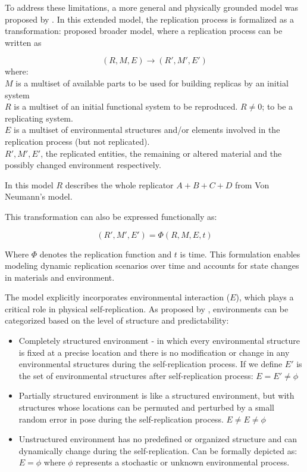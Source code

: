 To address these limitations, a more general and physically grounded model was proposed by \citeauthor{Lee2007Robotic} \cite{Lee2007Robotic}. In this extended model, the replication process is formalized as a transformation:
\citeauthor{Lee2007Robotic} proposed broader model, where a replication process can
be written as

\begin{equation}
    \label{eq:formalModel2arrow}
    (R, M, E) \rightarrow (R' , M' , E' ) 
\end{equation}
where: \\
$M$ is a multiset of available parts to be used for building replicas by an initial system \\
$R$ is a multiset of an initial functional system to be reproduced. 
$R \neq 0$; to be a replicating system. \\ 
$E$ is a multiset of environmental structures and/or elements involved in 
the replication process (but not replicated). \\
$R', M', E'$, the replicated entities, the remaining or altered material 
and the possibly changed environment respectively.

In this model $R$ describes the whole replicator $ A+B+C+D $  from Von Neumann's model.

This transformation can also be expressed functionally as:

\begin{equation}
    \label{eq:formalModel2phi}
    (R' , M' , E' ) = \Phi(R, M, E, t) 
\end{equation}

Where $\Phi$ denotes the replication function and $t$ is time. 
This formulation enables modeling dynamic replication scenarios over 
time and accounts for state changes in materials and environment.

The model explicitly incorporates environmental interaction ($E$), 
which plays a critical role in physical self-replication. 
As proposed by \citeauthor{Eno2007ReplicationNoControl} \cite{Eno2007ReplicationNoControl}, 
environments can be categorized based on the level of structure and predictability:
\begin{itemize}
    \item Completely structured environment - in which every environmental structure is fixed at a precise location 
        and there is no modification or change in any environmental
        structures during the self-replication process. 
        If we define $E'$ is the set of environmental structures after self-replication process:
        $E = E' \neq \phi $ 
    \item Partially structured environment is like a structured environment, but
        with structures whose locations can be permuted and perturbed 
        by a small random error in pose during the self-replication process.
        $ E \neq E \neq \phi $ 
    \item Unstructured environment has no predefined or organized structure and 
        can dynamically change during the self-replication.
        Can be formally depicted as:  
        $ E = \phi $ 
where $\phi$ represents a stochastic or unknown environmental process.
\end{itemize}



